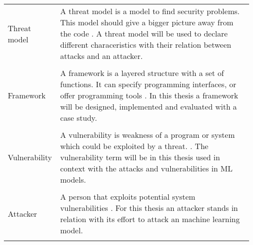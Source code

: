 \begin{center}
\begin{tabular}{ |L{4cm}|L{10cm}|  }
    \hline
    Threat model & A threat model is a model to find security problems.
    This model should give a bigger picture away from the code \cite{shostack_2017}. A threat model will be used to declare different characeristics with their relation between attacks and an attacker. \\
    & \\
    \hline
    Framework & A framework is a layered structure with a set of functions. It can specify programming interfaces, or offer programming tools \cite{FIPS1402}. In this thesis a framework will be designed, implemented and evaluated with a case study. \\
    & \\
    \hline
    Vulnerability & A vulnerability is weakness of a program or system which could be exploited by a threat. \cite{FIPS1402}. The vulnerability term will be in this thesis used in context with the attacks and vulnerabilities in ML models. \\
    & \\
    \hline
    Attacker & A person that exploits potential system vulnerabilities \cite{FIPS1402}. For this thesis an attacker stands in relation with its effort to attack an machine learning model. \\
    & \\
    \hline
  \end{tabular}
\end{center}

\newpage

